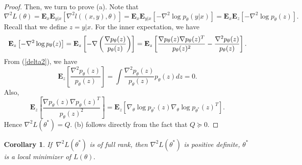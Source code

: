 \documentclass[11pt,letterpaper]{article}
\newcommand{\expt}{\mathbf{E}}
\newtheorem{corollary}{Corollary}
\newtheorem{lemma}{Lemma}
\theoremstyle{definition}
\begin{document}
\begin{proof}
Then, we turn to prove (a). Note that
\begin{equation*}
\nabla ^{2}L(\theta )=\expt_{x}\expt_{y|x}\left[ \nabla ^{2}l((x,y),\theta )\right]
=\expt_{x}\expt_{y|x}\left[ -\nabla ^{2}\log p_{\theta }(y|x)\right] =\expt_{x}\expt_{z}%
\left[ -\nabla ^{2}\log p_{\theta }(z)\right].
\end{equation*}%
Recall that we define $z = y|x$. For the inner expectation, we have
\begin{equation*}
\expt_{z}\left[ -\nabla ^{2}\log p_{\theta }(z)\right] =
\expt_{z}\left[ -\nabla \left(
\frac{\nabla p_{\theta }(z)}{p_{\theta }(z)} \right)\right] =
\expt_{z}\left[ \frac{%
\nabla p_{\theta }(z)\nabla p_{\theta }(z)^{T}}{p_{\theta }(z)^{2}}-\frac{%
\nabla ^{2}p_{\theta }(z)}{p_{\theta }(z)}\right] .
\end{equation*}%
From (\ref{delta2}), we have%
\begin{equation*}
\expt_{z}\left[ \frac{\nabla ^{2}p_{\theta }(z)}{p_{\theta }(z)}\right] =\int
\frac{\nabla ^{2}p_{\theta }(z)}{p_{\theta }(z)}p_{\theta }(z)dz=0.
\end{equation*}%
Also,
\begin{equation*}
\expt_{z}\left[ \frac{\nabla p_{\theta }(z)\nabla p_{\theta }(z)^{T}}{p_{\theta
}(z)^{2}}\right] = \expt_{z}[\nabla _{\theta }\log p_{\theta ^{\ast
}}(z)\nabla _{\theta }\log p_{\theta ^{\ast }}(z)^{T}].
\end{equation*}
Hence $\nabla^2 L(\theta^*) = Q$. (b) follows directly from the fact that $Q \succeq 0 $.
\end{proof}

\begin{corollary}
If $\ \nabla ^{2}L(\theta ^{\ast })$ is of full rank, then $\nabla ^{2}L(\theta
^{\ast })$ is positive definite, $\theta ^{\ast }$ is a local minimizer of $%
L(\theta ).$
\end{corollary}

\end{document}
